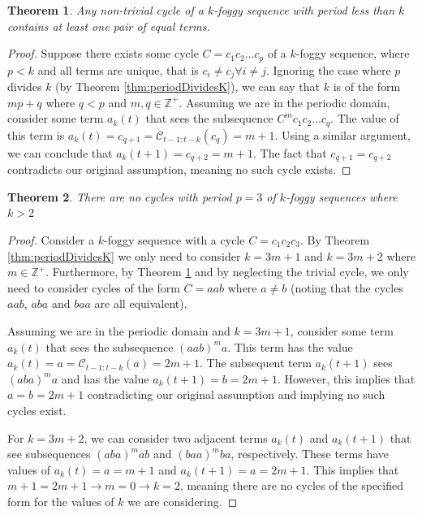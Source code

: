 \documentclass{article}
\newtheorem{theorem}{Theorem}
\begin{document}
\begin{theorem}
	Any non-trivial cycle of a $k$-foggy sequence with period less than $k$ contains at least one pair of equal terms.
	\label{thm:no-p-lessthan-k-unique-terms}
\end{theorem}

\begin{proof}
	Suppose there exists some cycle $C = c_1 c_2 \dots c_p$ of a $k$-foggy sequence, where $p < k$ and all terms are unique, that is $c_i \neq c_j \forall i \neq j$. Ignoring the case where $p$ divides $k$ (by Theorem \ref{thm:periodDividesK}), we can say that $k$ is of the form $mp + q$ where $q < p$ and $m, q \in \mathbb{Z}^+$. Assuming we are in the periodic domain, consider some term $a_k(t)$ that sees the subsequence $C^m c_1 c_2 \dots c_q$. The value of this term is $a_k(t) = c_{q+1} = \mathcal{C}_{t-1:t-k}(c_q) = m + 1$. Using a similar argument, we can conclude that $a_k(t+1) = c_{q+2} = m + 1$. The fact that $c_{q+1} = c_{q+2}$ contradicts our original assumption, meaning no such cycle exists. 
\end{proof}


\begin{theorem}
	There are no cycles with period $p = 3$ of $k$-foggy sequences where $k > 2$
	\label{thm:no-period-3-lessthan-k}
\end{theorem}

\begin{proof}
	Consider a $k$-foggy sequence with a cycle $C = c_1 c_2 c_3$. By Theorem \ref{thm:periodDividesK} we only need to consider $k = 3m + 1$ and $k = 3m + 2$ where $m \in \mathbb{Z}^+$. Furthermore, by Theorem \ref{thm:no-p-lessthan-k-unique-terms} and by neglecting the trivial cycle, we only need to consider cycles of the form $C = aab$ where $a \neq b$ (noting that the cycles $aab$, $aba$ and $baa$ are all equivalent).
	
	Assuming we are in the periodic domain and $k = 3m + 1$, consider some term $a_k(t)$ that sees the subsequence $(aab)^m a$. This term has the value $a_k(t) = a = \mathcal{C}_{t-1:t-k}(a) = 2m + 1$. The subsequent term $a_k(t+1)$ sees $(aba)^m a$ and has the value $a_k(t+1) = b = 2m+1$. However, this implies that $a = b = 2m+1$ contradicting our original assumption and implying no such cycles exist.
	
	For $k = 3m + 2$, we can consider two adjacent terms $a_k(t)$ and $a_k(t+1)$ that see subsequences $(aba)^m ab$ and $(baa)^m ba$, respectively. These terms have values of $a_k(t) = a = m+1$ and $a_k(t+1) = a = 2m+1$. This implies that $m+1 = 2m+1 \rightarrow m = 0 \rightarrow k = 2$, meaning there are no cycles of the specified form for the values of $k$ we are considering.
\end{proof}
\end{document}
